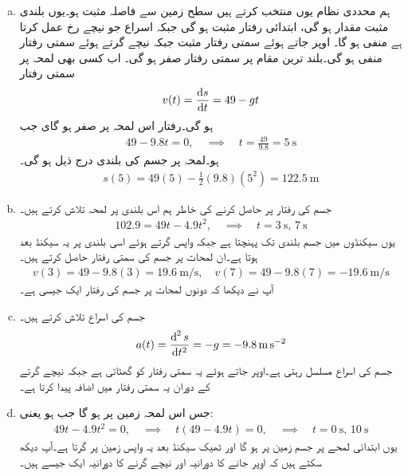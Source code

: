 \begin{enumerate}[a.]

\item
ہم محددی نظام یوں منتخب کرتے ہیں سطح زمین سے فاصلہ مثبت ہو۔یوں  بلندی  مثبت مقدار ہو گی،  ابتدائی رفتار مثبت ہو گی جبکہ اسراع جو نیچے رخ عمل کرتا ہے منفی ہو گا۔ اوپر جاتے ہوئے سمتی رفتار مثبت جبکہ نیچے گرتے ہوئے سمتی رفتار منفی ہو گی۔بلند ترین مقام پر سمتی رفتار صفر ہو گی۔ اب کسی بھی لمحہ پر سمتی رفتار
\begin{align*}
v(t)=\frac{\dif s}{\dif t}=49-gt
\end{align*}
ہو گی۔رفتار اس لمحہ پر صفر ہو گای جب 
\begin{align*}
49-9.8t=0,\quad \implies \quad t=\frac{49}{9.8}=\SI{5}{\second}
\end{align*} 
ہو۔لمحہ  پر جسم کی بلندی درج ذیل ہو گی۔
\begin{align*}
s(5)=49(5)-\frac{1}{2}(9.8)(5^2)=\SI{122.5}{\meter}
\end{align*}
\item
جسم کی رفتار  پر حاصل کرنے کی خاطر ہم اس بلندی پر لمحہ  تلاش کرتے ہیں۔
\begin{align*}
102.9=49t-4.9t^2,\quad \implies \quad t=\SI{3}{\second},\,\SI{7}{\second}
\end{align*}
یوں  سیکنڈوں میں جسم  بلندی تک پہنچتا ہے جبکہ واپس گرتے ہوئے اسی بلندی پر یہ  سیکنڈ بعد ہوتا ہے۔ان لمحات پر جسم کی سمتی رفتار حاصل کرتے ہیں۔
\begin{align*}
v(3)=49-9.8(3)=\SI{19.6}{\meter\per\second},\quad v(7)=49-9.8(7)=\SI{-19.6}{\meter\per\second}
\end{align*}
آپ نے دیکھا کہ دونوں لمحات پر جسم کی رفتار ایک جیسی ہے۔
\item
جسم کی اسراع تلاش کرتے ہیں۔
\begin{align*}
a(t)=\frac{\dif^{\,2}s}{\dif t^2}=-g=\SI{-9.8}{\meter\per\second\squared}
\end{align*}
جسم کی اسراع مسلسل  رہتی ہے۔اوپر جاتے ہوئے یہ سمتی رفتار کو گھٹاتی ہے جبکہ نیچے گرتے کے دوران یہ سمتی رفتار میں اضافہ پیدا کرتا ہے۔ 
\item
جس اس لمحہ زمین پر ہو گا جب  ہو یعنی:
\begin{align*}
49t-4.9t^2=0,\quad \implies \quad t(49-4.9t)=0,\quad \implies \quad t=\SI{0}{\second}, \, \SI{10}{\second}
\end{align*}
یوں ابتدائی لمحے پر جسم زمین پر ہو گا اور ٹھیک  سیکنڈ بعد یہ واپس زمین پر گرتا ہے۔آپ دیکھ سکتے ہیں کہ اوپر جانے کا دورانیہ اور نیچے گرنے کا دورانیہ ایک جیسے ہیں۔
\end{enumerate}
